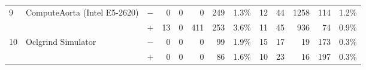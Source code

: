 \begin{tabular}{lll | rrrrr | rrrrr }
\hline
\multirow{ 2}{*}{9} & \multirow{ 2}{*}{ComputeAorta (Intel E5-2620)} & $-$ & 0 & 0 & 0 & 249 & 1.3\%       & 12 & 44 & 1258 & 114 & 1.2\% \\& & $+$ & 13 & 0 & 411 & 253 & 3.6\% & 11 & 45 & 936 & 74 & 0.9\% \\
\hline
\multirow{ 2}{*}{10} & \multirow{ 2}{*}{Oclgrind Simulator} & $-$ & 0 & 0 & 0 & 99 & 1.9\%       & 15 & 17 & 19 & 173 & 0.3\% \\& & $+$ & 0 & 0 & 0 & 86 & 1.6\% & 10 & 23 & 16 & 197 & 0.3\% \\
  \bottomrule
\end{tabular}

